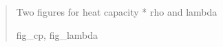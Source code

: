 \documentclass[letterpaper,10pt,english]{sphinxmanual}
\begin{document}
\begin{fulllineitems}
\begin{fulllineitems}
\begin{quote}
\begin{description}
\begin{itemize}
\end{itemize}

\sphinxAtStartPar
Two figures for heat capacity * rho and lambda

\sphinxAtStartPar
fig\_cp, fig\_lambda

\end{description}\end{quote}

\end{fulllineitems}


\end{fulllineitems}

\end{document}
